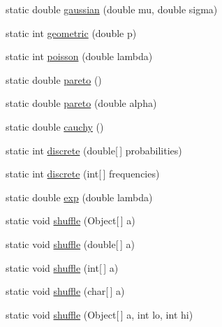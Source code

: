 \begin{DoxyCompactItemize}
static double \hyperlink{classcom_1_1mycompany_1_1myfirstmapboxapp_1_1_std_random_a3a342ece7c596c34dd36e55ae858a5a1}{gaussian} (double mu, double sigma)
\item 
static int \hyperlink{classcom_1_1mycompany_1_1myfirstmapboxapp_1_1_std_random_a96f74a60d4b91a67b179088dd3370912}{geometric} (double p)
\item 
static int \hyperlink{classcom_1_1mycompany_1_1myfirstmapboxapp_1_1_std_random_a7d3a37f92905207173e4a307cfb43c29}{poisson} (double lambda)
\item 
static double \hyperlink{classcom_1_1mycompany_1_1myfirstmapboxapp_1_1_std_random_ae5de830a90656263586246ec72724a18}{pareto} ()
\item 
static double \hyperlink{classcom_1_1mycompany_1_1myfirstmapboxapp_1_1_std_random_a92d33e49c022f90cb052750fdc49f079}{pareto} (double alpha)
\item 
static double \hyperlink{classcom_1_1mycompany_1_1myfirstmapboxapp_1_1_std_random_ac03102b47e3262aba0a865aad089bb73}{cauchy} ()
\item 
static int \hyperlink{classcom_1_1mycompany_1_1myfirstmapboxapp_1_1_std_random_a075bad8a6c834d2ea39ee56feffcdd67}{discrete} (double\mbox{[}$\,$\mbox{]} probabilities)
\item 
static int \hyperlink{classcom_1_1mycompany_1_1myfirstmapboxapp_1_1_std_random_a0dfb1912ed6ef49c7bccdde1c0efd08a}{discrete} (int\mbox{[}$\,$\mbox{]} frequencies)
\item 
static double \hyperlink{classcom_1_1mycompany_1_1myfirstmapboxapp_1_1_std_random_ad7629074e0893c07f3d773e4b5c7198f}{exp} (double lambda)
\item 
static void \hyperlink{classcom_1_1mycompany_1_1myfirstmapboxapp_1_1_std_random_a5b6775422fed87e7f618d61bfd693218}{shuffle} (Object\mbox{[}$\,$\mbox{]} a)
\item 
static void \hyperlink{classcom_1_1mycompany_1_1myfirstmapboxapp_1_1_std_random_ad44d6012a95f3fcc9724a06e564c72ce}{shuffle} (double\mbox{[}$\,$\mbox{]} a)
\item 
static void \hyperlink{classcom_1_1mycompany_1_1myfirstmapboxapp_1_1_std_random_a2268ef0a6c2ec7a1ec73402330105d84}{shuffle} (int\mbox{[}$\,$\mbox{]} a)
\item 
static void \hyperlink{classcom_1_1mycompany_1_1myfirstmapboxapp_1_1_std_random_a368b7c084499c8d1309b778185bbec7e}{shuffle} (char\mbox{[}$\,$\mbox{]} a)
\item 
static void \hyperlink{classcom_1_1mycompany_1_1myfirstmapboxapp_1_1_std_random_ae44a8d5b9f24f0d6177a8f55175aee4c}{shuffle} (Object\mbox{[}$\,$\mbox{]} a, int lo, int hi)

\end{DoxyCompactItemize}
